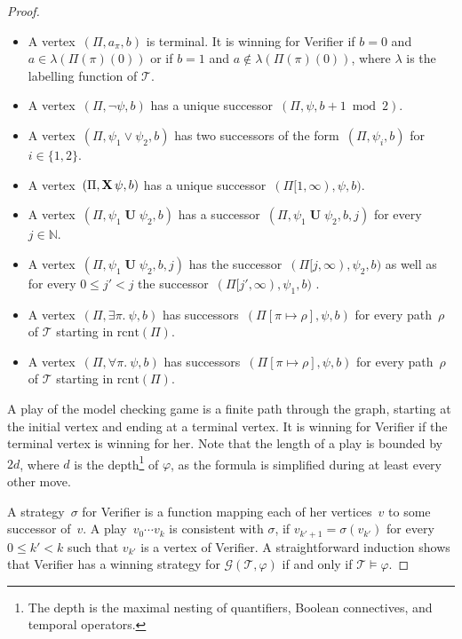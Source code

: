 \documentclass[dvipsnames,10pt,a4paper]{amsart}
\theoremstyle{definition}
\theoremstyle{remark}
\newcommand{\mcgame}{\mathcal{G}}
\newcommand{\last}{\mathrm{rcnt}}
\newcommand{\set}[1]{\{#1\}}
\newcommand{\nats}{\mathbb{N}}
\newcommand{\tsys}{\mathcal{T}}
\DeclareMathOperator{\U}{\mathbf{U}}
\newcommand{\X}{\mathop{\mathbf{X}\vphantom{a}}\nolimits}
\newcommand{\suffix}[2]{#1[#2,\infty)}
\begin{document}
\begin{proof}
\begin{itemize}
	\item A vertex~$(\Pi, a_\pi, b)$ is terminal. It is winning for Verifier if $b = 0$ and $a \in \lambda(\Pi(\pi)(0))$ or if $b=1$ and $a \notin \lambda(\Pi(\pi)(0))$, where $\lambda$ is the labelling function of $\tsys$.
	
	\item A vertex~$(\Pi, \neg \psi, b)$ has a unique successor~$(\Pi,\psi, b+1 \bmod 2)$.
	
	\item A vertex~$(\Pi, \psi_1\vee \psi_2, b)$ has two successors of the form~$(\Pi, \psi_i, b)$ for $i \in \set{1,2}$.
	
	\item A vertex~$(\Pi, \X \psi, b)$ has a unique successor~$(\suffix{\Pi}{1}, \psi, b)$.
	
	\item A vertex~$(\Pi, \psi_1\U \psi_2, b)$ has a successor~$(\Pi, \psi_1\U \psi_2, b,j)$ for every $j \in \nats$.
	
	\item A vertex~$(\Pi, \psi_1\U \psi_2, b,j)$ has the  successor~$(\suffix{\Pi}{j}, \psi_2, b)$ as well as for every $0 \le j' <j$ the successor~$(\suffix{\Pi}{j'}, \psi_1, b)$ .
	
	\item A vertex~$(\Pi, \exists \pi.\ \psi, b)$ has successors~$(\Pi[\pi\mapsto \rho],\psi, b)$ for every path~$\rho$ of $\tsys$ starting in $\last(\Pi)$.
	
	\item A vertex~$(\Pi, \forall \pi.\ \psi, b)$ has successors~$(\Pi[\pi\mapsto \rho],\psi, b)$ for every path~$\rho$ of $\tsys$ starting in $\last(\Pi)$.
\end{itemize}

A play of the model checking game is a finite path through the graph, starting at the initial vertex and ending at a terminal vertex. It is winning for Verifier if the terminal vertex is winning for her. 
Note that the length of a play is bounded by~$2d$, where $d$ is the depth\footnote{The depth is the maximal nesting of quantifiers, Boolean connectives, and temporal operators.} of $\varphi$, as the formula is simplified during at least every other move.

A strategy~$\sigma$ for Verifier is a function mapping each of her vertices~$v$  to some successor of~$v$. 
A play~$v_0 \cdots v_k$ is consistent with $\sigma$, if $v_{k'+1} = \sigma(v_{k'})$ for every $0 \le k' < k$ such that $v_{k'}$ is a vertex of Verifier.
A straightforward induction shows that Verifier has a winning strategy for $\mcgame(\tsys,\varphi)$ if and only if $\tsys\models\varphi$.
 

\end{proof}
\end{document}
